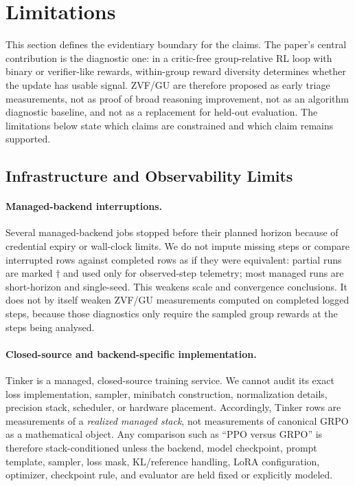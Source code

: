 \section{Limitations}
\label{sec:limitations}

This section defines the evidentiary boundary for the claims.  The paper's
central contribution is the diagnostic one: in a critic-free group-relative RL
loop with binary or verifier-like rewards, within-group reward diversity
determines whether the update has usable signal.  ZVF/GU are therefore proposed
as early triage measurements, not as proof of broad reasoning improvement, not
as an algorithm diagnostic baseline, and not as a replacement for held-out evaluation.
The limitations below state which claims are constrained and which claim remains
supported.

\subsection{Infrastructure and Observability Limits}
\label{sec:infra_failures}

\paragraph{Managed-backend interruptions.}
Several managed-backend jobs stopped before their planned horizon because of
credential expiry or wall-clock limits.  We do not impute missing steps or
compare interrupted rows against completed rows as if they were equivalent:
partial runs are marked $\dagger$ and used only for observed-step telemetry;
most managed runs are short-horizon and single-seed.
This weakens scale and convergence conclusions.  It does not by itself weaken
ZVF/GU measurements computed on completed logged steps, because those diagnostics
only require the sampled group rewards at the steps being analysed.

\paragraph{Closed-source and backend-specific implementation.}
Tinker is a managed, closed-source training service.  We cannot audit its exact
loss implementation, sampler, minibatch construction, normalization details,
precision stack, scheduler, or hardware placement.  Accordingly, Tinker rows are
measurements of a \emph{realized managed stack}, not measurements of canonical
GRPO as a mathematical object.  Any comparison such as ``PPO versus GRPO'' is
therefore stack-conditioned unless the backend, model checkpoint, prompt
template, sampler, loss mask, KL/reference handling, LoRA configuration,
optimizer, checkpoint rule, and evaluator are held fixed or explicitly modeled.

